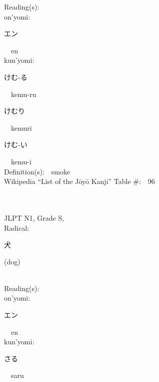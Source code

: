 \begin{multicols}{2}
Reading(s):\ \ \\
{\hspace*{1em}}on'yomi:\ \ \\
{\hspace*{2em}}{\begin{CJK}{UTF8}{min} エン \end{CJK}}\ \ en\ \ \\
{\hspace*{1em}}kun'yomi:\ \ \\
{\hspace*{2em}}{\begin{CJK}{UTF8}{min} けむ-る \end{CJK}}\ \ kemu-ru\ \ \\
{\hspace*{2em}}{\begin{CJK}{UTF8}{min} けむり \end{CJK}}\ \ kemuri\ \ \\
{\hspace*{2em}}{\begin{CJK}{UTF8}{min} けむ-い \end{CJK}}\ \ kemu-i\ \ \\
Definition(s):\ \ smoke \\
Wikipedia ``List of the J\=oy\=o Kanji'' Table \#:\ \ 96 \\
\ \ \\
{\fontsize{34pt}{40pt}  }\ \ \\
{JLPT N1, Grade S, \\Radical:\ \ {\begin{CJK}{UTF8}{min} 犬 \end{CJK}} (dog) } \\
Reading(s):\ \ \\
{\hspace*{1em}}on'yomi:\ \ \\
{\hspace*{2em}}{\begin{CJK}{UTF8}{min} エン \end{CJK}}\ \ en\ \ \\
{\hspace*{1em}}kun'yomi:\ \ \\
{\hspace*{2em}}{\begin{CJK}{UTF8}{min} さる \end{CJK}}\ \ saru\ \ \\

\end{multicols}
